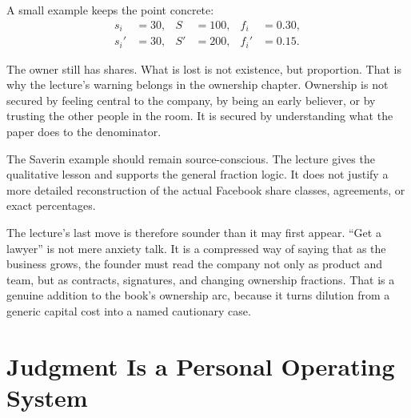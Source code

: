 \documentclass[11pt,oneside]{book}
\begin{document}
A small example keeps the point concrete:
\begin{align}
s_i &= 30, &
S &= 100, &
f_i &= 0.30,\\
s_i' &= 30, &
S' &= 200, &
f_i' &= 0.15.
\end{align}

The owner still has shares. What is lost is not existence, but proportion. That is why the lecture's warning belongs in the ownership chapter. Ownership is not secured by feeling central to the company, by being an early believer, or by trusting the other people in the room. It is secured by understanding what the paper does to the denominator.

\begin{remark}
The Saverin example should remain source-conscious. The lecture gives the qualitative lesson and supports the general fraction logic. It does not justify a more detailed reconstruction of the actual Facebook share classes, agreements, or exact percentages.
\end{remark}

The lecture's last move is therefore sounder than it may first appear. ``Get a lawyer'' is not mere anxiety talk. It is a compressed way of saying that as the business grows, the founder must read the company not only as product and team, but as contracts, signatures, and changing ownership fractions. That is a genuine addition to the book's ownership arc, because it turns dilution from a generic capital cost into a named cautionary case.


\chapter{Judgment Is a Personal Operating System}
\end{document}
